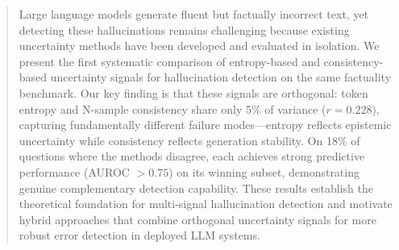 \begin{abstract}
Large language models generate fluent but factually incorrect text, yet detecting these hallucinations remains challenging because existing uncertainty methods have been developed and evaluated in isolation. We present the first systematic comparison of entropy-based and consistency-based uncertainty signals for hallucination detection on the same factuality benchmark. Our key finding is that these signals are orthogonal: token entropy and N-sample consistency share only 5\% of variance ($r = 0.228$), capturing fundamentally different failure modes---entropy reflects epistemic uncertainty while consistency reflects generation stability. On 18\% of questions where the methods disagree, each achieves strong predictive performance (AUROC $> 0.75$) on its winning subset, demonstrating genuine complementary detection capability. These results establish the theoretical foundation for multi-signal hallucination detection and motivate hybrid approaches that combine orthogonal uncertainty signals for more robust error detection in deployed LLM systems.
\end{abstract}

